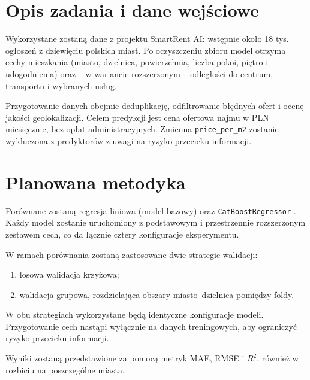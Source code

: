 \documentclass[10pt,a4paper]{article}
\begin{document}
	
	\section{Opis zadania i dane wejściowe}
	
	Wykorzystane zostaną dane z projektu SmartRent AI:
	wstępnie około 18 tys. ogłoszeń z dziewięciu polskich miast.
	Po oczyszczeniu zbioru model otrzyma cechy mieszkania
	(miasto, dzielnica, powierzchnia, liczba pokoi, piętro
	i udogodnienia) oraz -- w wariancie rozszerzonym --
	odległości do centrum, transportu i wybranych usług.
	
	Przygotowanie danych obejmie deduplikację, odfiltrowanie
	błędnych ofert i ocenę jakości geolokalizacji.
	Celem predykcji jest cena ofertowa najmu w PLN miesięcznie,
	bez opłat administracyjnych.
	Zmienna \texttt{price\_per\_m2} zostanie wykluczona
	z predyktorów z uwagi na ryzyko przecieku informacji.
	
	
	\section{Planowana metodyka}
	
	Porównane zostaną regresja liniowa (model bazowy) oraz
	\texttt{CatBoostRegressor} \cite{prokhorenkova2018}.
	Każdy model zostanie uruchomiony z podstawowym i przestrzennie
	rozszerzonym zestawem cech, co da łącznie cztery konfiguracje
	eksperymentu.
	
	W ramach porównania zostaną zastosowane dwie strategie walidacji:
	
	\begin{enumerate}
		\item losowa walidacja krzyżowa;
		\item walidacja grupowa, rozdzielająca obszary
		miasto--dzielnica pomiędzy foldy.
	\end{enumerate}
	
	W obu strategiach wykorzystane będą identyczne konfiguracje modeli.
	Przygotowanie cech nastąpi wyłącznie na danych treningowych,
	aby ograniczyć ryzyko przecieku informacji.
	
	Wyniki zostaną przedstawione za pomocą metryk MAE, RMSE i $R^2$,
	również w rozbiciu na poszczególne miasta.
	
\end{document}
